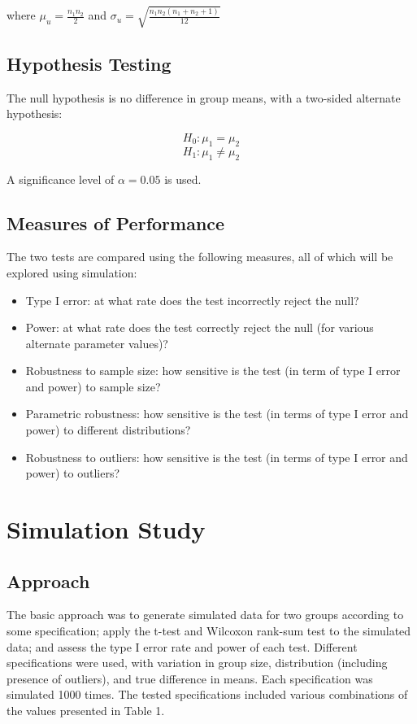 \documentclass{report}
\begin{document}
where $\mu_u = \frac{n_1n_2}{2}$ and $\sigma_u =
\sqrt{\frac{n_1n_2(n_1+n_2+1)}{12}}$

\subsection*{Hypothesis Testing}

The null hypothesis is no difference in group means, with a two-sided alternate
hypothesis:

$$
H_0: \mu_1 = \mu_2
$$
$$
H_1: \mu_1 \neq \mu_2
$$

A significance level of $\alpha = 0.05$ is used.

\subsection*{Measures of Performance}

The two tests are compared using the following measures, all of which will be
explored using simulation:

\begin{itemize}
	\item Type I error: at what rate does the test incorrectly reject the null?
	\item Power: at what rate does the test correctly reject the null (for various
		alternate parameter values)?
	\item Robustness to sample size: how sensitive is the test (in term of type I
		error and power) to sample size?
	\item Parametric robustness: how sensitive is the test
		(in terms of type I error and power) to different distributions?
	\item Robustness to outliers: how sensitive is the test (in terms of
		type I error and power) to outliers?
\end{itemize}

\section*{Simulation Study}
\subsection*{Approach}
The basic approach was to generate simulated data for two
groups according to some specification; apply the t-test
and Wilcoxon rank-sum test to the simulated data; and assess the type I error rate and power of each
test. Different specifications were used, with variation in group
size, distribution (including presence of outliers), and true difference in
means. Each specification was simulated 1000 times. The tested specifications 
included various combinations of the values presented in Table 1.
\end{document}

